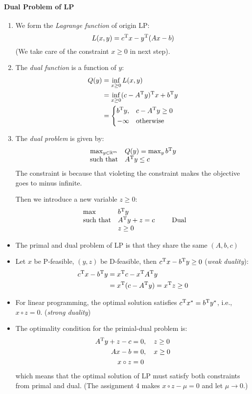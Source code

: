 \paragraph{Dual Problem of LP}
\begin{enumerate}
\item
We form the \emph{Lagrange function} of origin LP:
\[
L(x,y)=c^{\mathrm T} x-y^{\mathrm T}(Ax-b)
\]
(We take care of the constraint $x\ge0$ in next step).
\item
The \emph{dual function} is a function of $y$:
\begin{align*}
Q(y) &= \inf_{x\ge0}L(x,y)\\
&=\inf_{x\ge0}(c-A^{\mathrm T} y)^{\mathrm T} x+b^{\mathrm T} y\\
&=\left\{
\begin{aligned}
b^{\mathrm T} y,&\quad c-A^{\mathrm T} y\ge0\\
-\infty&\quad \mbox{otherwise}
\end{aligned}
\right.
\end{align*}
\item
The \emph{dual problem} is given by:
\[
\begin{array}{ll}
\max_{y\in\mathbb{R}^m}&Q(y)=\max_{y}b^{\mathrm T} y\\
\mbox{such that}&A^{\mathrm T} y\le c
\end{array}
\]
The constraint is because that violeting the constraint makes the objective goes to minus infinite.

Then we introduce a new variable $z\ge0$:
 \[
\begin{array}{ll}
\max&b^{\mathrm T} y\\
\mbox{such that}&A^{\mathrm T} y+z= c\\
&z\ge0
\end{array}\qquad\mbox{Dual}
\]
\end{enumerate}
\begin{itemize}
\item
The primal and dual problem of LP is that they share the same $(A,b,c)$
\item
Let $x$ be P-feasible, $(y,z)$ be D-feasible, then $c^{\mathrm T} x-b^{\mathrm T} y\ge0$ (\emph{weak duality}):
\begin{align*}
c^{\mathrm T} x-b^{\mathrm T} y&=x^{\mathrm T} c-x^{\mathrm T} A^{\mathrm T} y\\
&=x^{\mathrm T}(c-A^{\mathrm T} y)=x^{\mathrm T} z\ge0
\end{align*}
\item
For linear programming, the optimal solution satisfies $c^{\mathrm T} x^* = b^{\mathrm T} y^*$, i.e., $x\circ z=0$.
(\emph{strong duality})
\item
The optimality condition for the primial-dual problem is:
\begin{align*}
A^{\mathrm T} y+z-c&=0,\quad z\ge0\\
Ax-b&=0,\quad x\ge0\\
x\circ z&=0
\end{align*}
which means that the optimal solution of LP must satisfy both constraints from primal and dual. (The assignment 4 makes $x\circ z-\mu=0$ and let $\mu\to0$.)
\end{itemize}












